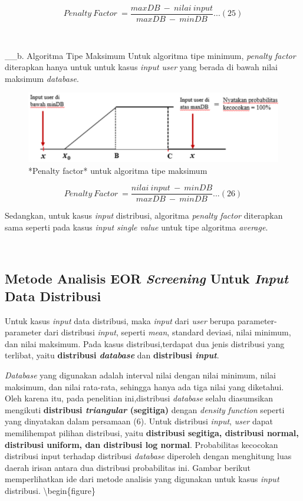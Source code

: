 \documentclass[
]{book}
\begin{document}
\[Penalty\ Factor\ = \frac{maxDB\ -\ nilai\ input}{maxDB\ -\ minDB}...(25)\]

~

\_\_b. Algoritma Tipe Maksimum
Untuk algoritma tipe minimum, \emph{penalty factor} diterapkan hanya untuk untuk kasus \emph{input user} yang berada di bawah nilai maksimum \emph{database}.

\begin{figure}

{\centering \includegraphics[width=0.5\linewidth]{images/screening/tipe_maksimum1} 

}

\caption{*Penalty factor* untuk algoritma tipe maksimum}\label{fig:unnamed-chunk-31}
\end{figure}

\[Penalty\ Factor\ = \frac{nilai\ input\ -\ minDB}{maxDB\ -\ minDB}...(26)\]

Sedangkan, untuk kasus \emph{input} distribusi, algoritma \emph{penalty factor} diterapkan sama seperti pada kasus \emph{input single value} untuk tipe algoritma \emph{average}.

~

\hypertarget{metode-analisis-eor-screening-untuk-input-data-distribusi}{%
\subsection{\texorpdfstring{Metode Analisis EOR \emph{Screening} Untuk \emph{Input} Data Distribusi}{Metode Analisis EOR Screening Untuk Input Data Distribusi}}\label{metode-analisis-eor-screening-untuk-input-data-distribusi}}

Untuk kasus \emph{input} data distribusi, maka \emph{input} dari \emph{user} berupa parameter-parameter dari distribusi \emph{input}, seperti \emph{mean}, standard deviasi, nilai minimum, dan nilai maksimum. Pada kasus distribusi,terdapat dua jenis distribusi yang terlibat, yaitu \textbf{distribusi \emph{database}} dan \textbf{distribusi \emph{input}}.

\emph{Database} yang digunakan adalah interval nilai dengan nilai minimum, nilai maksimum, dan nilai rata-rata, sehingga hanya ada tiga nilai yang diketahui. Oleh karena itu, pada penelitian ini,distribusi \emph{database} selalu diasumsikan mengikuti \textbf{distribusi \emph{triangular} (segitiga)} dengan \emph{density} \emph{function} seperti yang dinyatakan dalam persamaan (6). Untuk distribusi \emph{input}, \emph{user} dapat memilihempat pilihan distribusi, yaitu \textbf{distribusi segitiga, distribusi normal, distribusi uniform, dan distribusi log normal}. Probabilitas kecocokan distribusi input terhadap distribusi \emph{database} diperoleh dengan menghitung luas daerah irisan antara dua distribusi probabilitas ini. Gambar berikut memperlihatkan ide dari metode analisis yang digunakan untuk kasus \emph{input} distribusi.
\textbackslash begin\{figure\}
\end{document}
